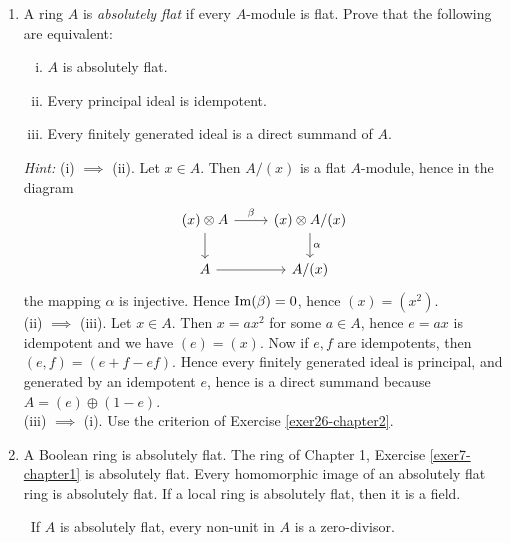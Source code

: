 \begin{enumerate}
    \item \label{exer27-chapter2}A ring $A$ is \emph{absolutely flat} if every $A$-module is flat. Prove that the following are equivalent:
    \begin{enumerate}[i)]
        \item $A$ is absolutely flat.
        \item Every principal ideal is idempotent.
        \item Every finitely generated ideal is a direct summand of $A$.
    \end{enumerate}
    \textit{Hint:} (i) $\implies$ (ii). Let $x \in A$. Then $A/(x)$ is a flat $A$-module, hence in the diagram
    \[\begin{tikzcd}
        {(x)\otimes A} & {(x)\otimes A/(x)} \\
        A & {A/(x)}
        \arrow["\beta", from=1-1, to=1-2]
        \arrow[from=1-1, to=2-1]
        \arrow["\alpha", from=1-2, to=2-2]
        \arrow[from=2-1, to=2-2]
    \end{tikzcd}\]
    the mapping $\alpha$ is injective. Hence $\operatorname{Im}(\beta) = 0$, hence $(x) = (x^2)$.\\
    (ii) $\implies$ (iii). Let $x \in A$. Then $x = ax^2$ for some $a \in A$, hence $e = ax$ is idempotent and we have $(e) = (x)$. Now if $e, f$ are idempotents, then $(e, f) = (e + f - ef)$. Hence every finitely generated ideal is principal, and generated by an idempotent $e$, hence is a direct summand because $A = (e) \oplus (1-e)$.\\
    (iii) $\implies$ (i). Use the criterion of Exercise \ref{exer26-chapter2}.

    \item \label{exer28-chapter2}A Boolean ring is absolutely flat. The ring of Chapter 1, Exercise \ref{exer7-chapter1} is absolutely flat. Every homomorphic image of an absolutely flat ring is absolutely flat. If a local ring is absolutely flat, then it is a field.
    
    \quad\, If $A$ is absolutely flat, every non-unit in $A$ is a zero-divisor.
\end{enumerate}
